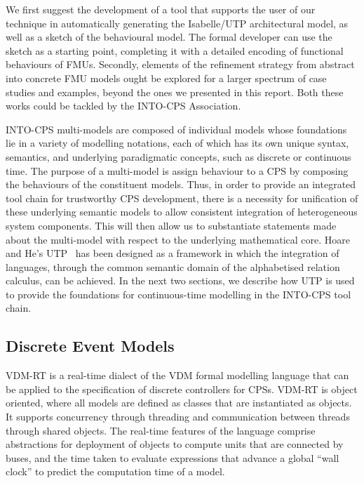 We first suggest the development of a tool that supports the user of our technique in automatically generating the Isabelle/UTP architectural model, as well as a sketch of the behavioural model. The formal developer can use the sketch as a starting point, completing it with a detailed encoding of functional behaviours of FMUs. Secondly, elements of the refinement strategy from abstract into concrete FMU models ought be explored for a larger spectrum of case studies and examples, beyond the ones we presented in this report. Both these works could be tackled by the INTO-CPS Association.

INTO-CPS multi-models are composed of individual models whose foundations lie in a variety of modelling notations, each of which has its own unique syntax, semantics, and underlying paradigmatic concepts, such as discrete or continuous time.  The purpose of a multi-model is assign behaviour to a CPS by composing the behaviours of the constituent models.  Thus, in order to provide an integrated tool chain for trustworthy CPS development, there is a necessity for unification of these underlying semantic models to allow consistent integration of heterogeneous system components.  This will then allow us to substantiate statements made about the multi-model with respect to the underlying mathematical core.  Hoare and He's UTP~\cite{Hoare&98} has been designed as a framework in which the integration of languages, through the common semantic domain of the alphabetised relation calculus, can be achieved.  In the next two sections, we describe how UTP is used to provide the foundations for continuous-time modelling in the INTO-CPS tool chain.

\subsection{Discrete Event Models}

VDM-RT is a real-time dialect of the VDM formal modelling language that can be applied to the specification of discrete controllers for CPSs.  VDM-RT is object oriented, where all models are defined as classes that are instantiated as objects.  It supports concurrency through threading and communication between threads through shared objects.  The real-time features of the language comprise abstractions for deployment of objects to compute units that are connected by buses, and the time taken to evaluate expressions that advance a global ``wall clock'' to predict the computation time of a model.

